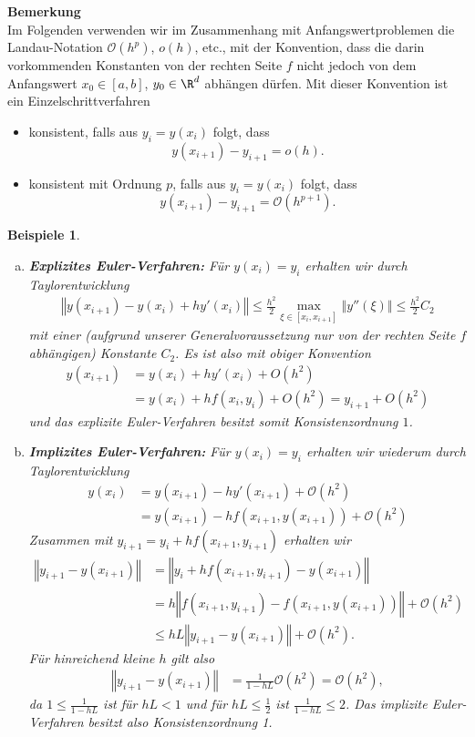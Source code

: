 \documentclass[
]{mycourse}
\theoremstyle{mythm}
\newtheorem{beispiele}[theorem]{Beispiele}
\theoremstyle{break}
\newcommand{\norm}[1]{\left\Vert#1\right\Vert}		%
\begin{document}
\medskip
\textbf{Bemerkung}\\
Im Folgenden verwenden wir im Zusammenhang mit Anfangswertproblemen
die Landau-Notation $\mathcal{O}(h^p)$, $o(h)$, etc., mit der Konvention, dass
die darin vorkommenden Konstanten von der rechten Seite $f$ nicht jedoch von dem Anfangswert $x_0\in [a,b]$, $y_0\in \R^d$
abhängen dürfen. Mit dieser Konvention ist ein Einzelschrittverfahren
\begin{itemize}
\item konsistent, falls aus $y_i=y(x_i)$ folgt, dass 
\[
y(x_{i+1})-y_{i+1}=o(h).
\]
\item konsistent mit Ordnung $p$, falls aus $y_i=y(x_i)$ folgt, dass 
\[
y(x_{i+1})-y_{i+1}=\mathcal{O}(h^{p+1}).
\]
\end{itemize}

\medskip

\begin{beispiele}
\begin{enumerate}[(a)]
\item \textbf{Explizites Euler-Verfahren:} Für $y(x_i)=y_i$ erhalten wir durch Taylorentwicklung
\begin{align*}
\norm{y(x_{i+1}) - y(x_i)+h y'(x_i)}
\leq \frac{h^2}{2} \max_{\xi\in [x_i,x_{i+1}]} \norm{y''(\xi)}\leq \frac{h^2}{2} C_2
\end{align*}
mit einer (aufgrund unserer Generalvoraussetzung nur von der rechten Seite $f$ abhängigen) Konstante $C_2$. Es ist also mit obiger Konvention
\begin{align*}
y(x_{i+1}) &= y(x_i)+h y'(x_i) + O(h^2)\\
&= y(x_i)+h f(x_i,y_i) + O(h^2) = y_{i+1} + O(h^2)
\end{align*}
und das explizite Euler-Verfahren besitzt somit Konsistenzordnung $1$.
%
\item \textbf{Implizites Euler-Verfahren:} Für $y(x_i)=y_i$ erhalten wir wiederum durch Taylorentwicklung
\begin{align*}
y(x_i) &=y(x_{i+1})- h y'(x_{i+1}) + \mathcal{O}(h^2)\\
       &=y(x_{i+1})- h f(x_{i+1},y(x_{i+1})) + \mathcal{O}(h^2)
\end{align*}
Zusammen mit $y_{i+1}=y_i+hf(x_{i+1},y_{i+1})$ erhalten wir
\begin{align*}
\norm{y_{i+1}-y(x_{i+1})} &= \norm{ y_i+h f(x_{i+1},y_{i+1}) - y(x_{i+1})}\\
&= h \norm{ f(x_{i+1},y_{i+1})-f(x_{i+1},y(x_{i+1})) } + \mathcal{O}(h^2)\\
& \leq h L \norm{ y_{i+1}-y(x_{i+1})}+ \mathcal{O}(h^2).
\end{align*}
Für hinreichend kleine $h$ gilt also
\begin{align*}
\norm{y_{i+1}-y(x_{i+1})} &= \frac{1}{1-hL} \mathcal{O}(h^2)=\mathcal{O}(h^2),
\end{align*}
da $ 1 \leq \frac{1}{1-hL} $ ist für $hL < 1$ und für $hL \leq \frac{1}{2}$ ist $ \frac{1}{1-hL} \leq 2$.
Das implizite Euler-Verfahren besitzt also Konsistenzordnung 1.
\end{enumerate}
\end{beispiele}
\end{document}

